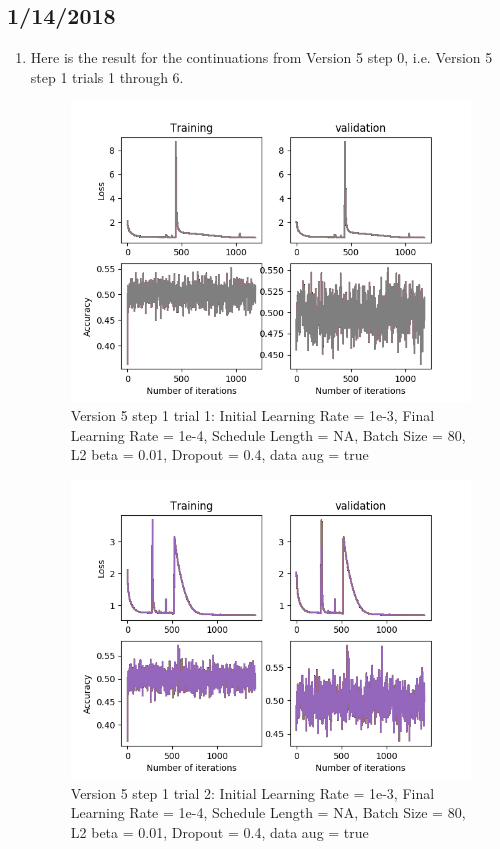 \documentclass[12pt,reqno]{amsart}
\numberwithin{equation}{section}
\begin{document}
\subsection{1/14/2018}
\begin{enumerate}
\item Here is the result for the continuations from Version 5 step 0, i.e. Version 5 step 1 trials 1 through 6.  

\begin{figure}[H]
\centering
\includegraphics[scale=0.6]{data12_version5_step1}
\caption{Version 5 step 1 trial 1: Initial Learning Rate = 1e-3, Final Learning Rate = 1e-4, Schedule Length = NA, Batch Size = 80, L2 beta = 0.01, Dropout = 0.4, data aug = true}
\end{figure}

\begin{figure}[H]
\centering
\includegraphics[scale=0.6]{data12_version5_step1_trial2}
\caption{Version 5 step 1 trial 2: Initial Learning Rate = 1e-3, Final Learning Rate = 1e-4, Schedule Length = NA, Batch Size = 80, L2 beta = 0.01, Dropout = 0.4, data aug = true}
\end{figure}


\end{enumerate}
\end{document}
